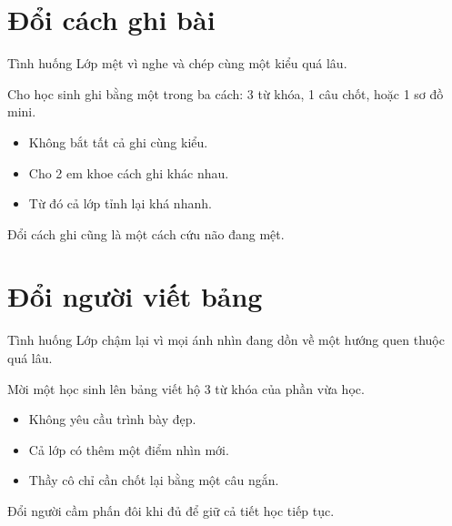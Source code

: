 \section{Đổi cách ghi bài}
\begin{tinhhuong}{Tình huống}
Lớp mệt vì nghe và chép cùng một kiểu quá lâu.
\end{tinhhuong}
\begin{goiydungngay}
Cho học sinh ghi bằng một trong ba cách: 3 từ khóa, 1 câu chốt, hoặc 1 sơ đồ mini.
\begin{itemize}
\item Không bắt tất cả ghi cùng kiểu.
\item Cho 2 em khoe cách ghi khác nhau.
\item Từ đó cả lớp tỉnh lại khá nhanh.
\end{itemize}
\end{goiydungngay}
\begin{cauchot}
Đổi cách ghi cũng là một cách cứu não đang mệt.
\end{cauchot}
\ngancach

\section{Đổi người viết bảng}
\begin{tinhhuong}{Tình huống}
Lớp chậm lại vì mọi ánh nhìn đang dồn về một hướng quen thuộc quá lâu.
\end{tinhhuong}
\begin{goiydungngay}
Mời một học sinh lên bảng viết hộ 3 từ khóa của phần vừa học.
\begin{itemize}
\item Không yêu cầu trình bày đẹp.
\item Cả lớp có thêm một điểm nhìn mới.
\item Thầy cô chỉ cần chốt lại bằng một câu ngắn.
\end{itemize}
\end{goiydungngay}
\begin{cauchot}
Đổi người cầm phấn đôi khi đủ để giữ cả tiết học tiếp tục.
\end{cauchot}
\ngancach

